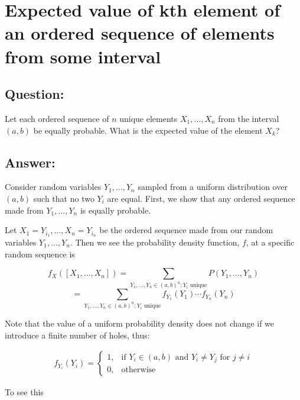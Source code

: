 \documentclass{article}
\begin{document}
\section{Expected value of kth element of an ordered sequence of elements from some interval}

\subsection{Question:}

Let each ordered sequence of $n$ unique elements $X_1, \dots, X_n$ from the interval $(a, b)$ be equally probable. What is the expected value of the element $X_k$?

\subsection{Answer:}

Consider random variables $Y_1, \dots, Y_n$ sampled from a uniform  distribution over $(a, b)$ such that no two $Y_i$ are equal. First, we show that any ordered sequence made from $Y_1, \dots, Y_n$ is equally probable.

Let $X_1 = Y_{i_1}, \dots, X_n = Y_{i_n}$ be the ordered sequence made from our random variables $Y_1, \dots, Y_n$. Then we see the probability density function, $f$, at a specific random sequence is

$$f_X([X_1, \dots, X_n]) = \sum_{Y_1, \dots, Y_n \in (a, b)^n; Y_i \text{ unique}} P(Y_1, \dots, Y_n) $$
$$= \sum_{Y_1, \dots, Y_n \in (a, b)^n; Y_i \text{ unique}} f_{Y_1}(Y_1)\cdots f_{Y_n}(Y_n)$$

Note that the value of a uniform probability density does not change if we introduce a finite number of holes, thus:

\begin{gather}
f_{Y_i}(Y_i) =  \begin{cases} 1,  & \text{if $Y_i \in (a, b)$ and $Y_i \neq Y_j$ for $j \neq i$} \\ 0, & \text{otherwise} \end{cases}
\end{gather}

To see this
\end{document}
